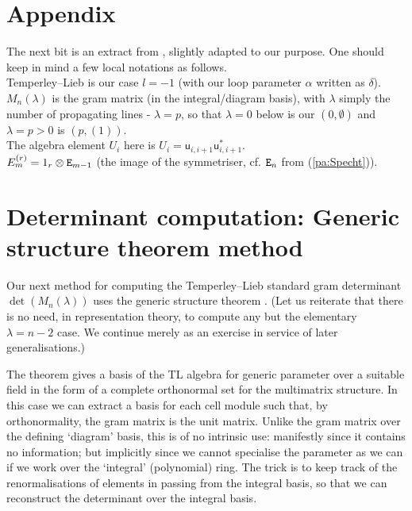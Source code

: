 \documentclass{article}
\theoremstyle{definition}
\newcommand{\xx}{\alpha}       %
\def\uu{{\mathsf u}} %
\numberwithin{equation}{subsection}
\begin{document}







\appendix
\newcommand{\texdd}{tex2}
\newcommand{\xfigdd}{tex2/xfig-bratelli5}
\newcommand{\xfigGST}{tex2/xfig-gramdetbyGST}
\vspace{1cm} \newpage 
\section*{Appendix}
The next bit is an extract from \cite{paulsonlinelecturenotes}, slightly adapted to our purpose. 
One should keep in mind a few local notations as follows. \\ 
Temperley--Lieb is our case $l=-1$ (with our loop parameter $\xx$ written as $\delta$). \\ 
$M_n(\lambda)$ is the gram matrix (in the integral/diagram basis), with 
$\lambda$ simply the number of propagating lines - 
$\lambda =p$, so that $\lambda=0$ below is our $(0,\emptyset)$ and $\lambda=p>0$ is $(p,(1))$. \\
The algebra element $U_i$ here is $U_i = \uu_{i,i+1} \uu_{i,i+1}^*$. \\
$E_m^{(r)} = 1_r \otimes {\mathtt{E}}_{m-1}$ (the image of the symmetriser, cf. ${\mathtt{E}}_n$ from (\ref{pa:Specht})). 



\section{Determinant computation: Generic structure theorem method}  \label{ss:gdTL}

Our next method for computing the
Temperley--Lieb standard 
gram determinant
$\det(M_n(\lambda ))$
uses the generic structure theorem \cite[Th.1]{Martin91}. 
(Let us reiterate that there is no need, in representation theory, 
to compute any but the
elementary $\lambda=n-2$ case. We continue merely as an exercise in
service of later generalisations.)

The theorem gives a basis of the TL algebra for generic parameter
over a suitable field in the form of a complete
orthonormal set for the multimatrix structure.
In this case we can extract a basis for each cell module such %
that, by orthonormality, the gram matrix is the unit matrix. 
Unlike the gram matrix over the defining `diagram' basis, this is of no
intrinsic use:  
manifestly since it contains no information; but implicitly
since we cannot specialise the 
parameter as we can if we work over the `integral' (polynomial) ring.
The trick is to keep track of the renormalisations of elements 
in passing from the integral basis, so that we can reconstruct
the determinant over the integral basis.  
\end{document}
